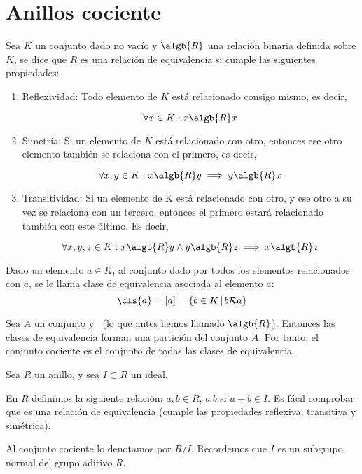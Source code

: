 \section{Anillos cociente}
\begin{defn}
	Sea $K$ un conjunto dado no vacío y $\algb{R}$ una relación binaria definida sobre $K$, se dice que $R$ es una relación de equivalencia si cumple las siguientes propiedades:
	\begin{enumerate}
		\item Reflexividad: Todo elemento de $K$ está relacionado consigo mismo, es decir,

		$$\forall x \in K: x \algb{R} x$$
		\item Simetría: Si un elemento de $K$ está relacionado con otro, entonces ese otro elemento también se relaciona con el primero, es decir,

		$$\forall x,y \in K: x \algb{R} y \implies y \algb{R} x$$

		\item Transitividad:  Si un elemento de K está relacionado con otro, y ese otro a su vez se relaciona con un tercero, entonces el primero estará relacionado también con este último. Es decir,

		$$\forall x,y,z \in K: x \algb{R} y \wedge y \algb{R} z \implies x \algb{R} z$$
	\end{enumerate}
\end{defn}

\begin{defn}
	Dado un elemento $a\in K$, al conjunto dado por todos los elementos relacionados con $a$, se le llama clase de equivalencia asociada al elemento $a$:
	$$ \cls{a}=[a] = \{b\in K\,|\,b\mathcal{R}a\} $$
\end{defn}

\begin{defn}
	Sea $A$ un conjunto y $~$ (lo que antes hemos llamado $\algb{R}$). Entonces las clases de equivalencia forman una partición del conjunto $A$. Por tanto, el conjunto cociente es el conjunto de todas las clases de equivalencia.
\end{defn}


Sea $R$ un anillo, y sea $I\subset R$ un ideal.

En $R$ definimos la siguiente relación: $a,b \in R$, $a~b$ si $a-b \in I$. Es fácil comprobar que es una relación de equivalencia (cumple las propiedades reflexiva, transitiva y simétrica).

Al conjunto cociente lo denotamos por $R/I$. Recordemos que $I$ es un subgrupo normal del grupo aditivo $R$.

